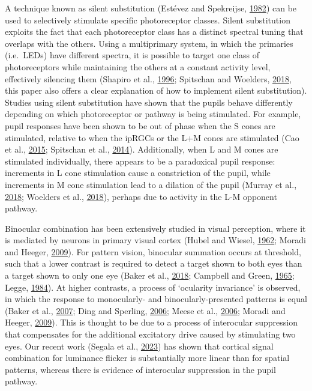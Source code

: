 \documentclass[
]{article}
\begin{document}
A technique known as silent substitution (Estévez and Spekreijse, \protect\hyperlink{ref-Estevez1982}{1982}) can be used to selectively stimulate specific photoreceptor classes. Silent substitution exploits the fact that each photoreceptor class has a distinct spectral tuning that overlaps with the others. Using a multiprimary system, in which the primaries (i.e.~LEDs) have different spectra, it is possible to target one class of photoreceptors while maintaining the others at a constant activity level, effectively silencing them (Shapiro et al., \protect\hyperlink{ref-Shapiro1996}{1996}; Spitschan and Woelders, \protect\hyperlink{ref-Spitschan2018}{2018}, this paper also offers a clear explanation of how to implement silent substitution). Studies using silent substitution have shown that the pupils behave differently depending on which photoreceptor or pathway is being stimulated. For example, pupil responses have been shown to be out of phase when the S cones are stimulated, relative to when the ipRGCs or the L+M cones are stimulated (Cao et al., \protect\hyperlink{ref-Cao2015}{2015}; Spitschan et al., \protect\hyperlink{ref-Spitschan2014}{2014}). Additionally, when L and M cones are stimulated individually, there appears to be a paradoxical pupil response: increments in L cone stimulation cause a constriction of the pupil, while increments in M cone stimulation lead to a dilation of the pupil (Murray et al., \protect\hyperlink{ref-Murray2018}{2018}; Woelders et al., \protect\hyperlink{ref-Woelders2018}{2018}), perhaps due to activity in the L-M opponent pathway.

Binocular combination has been extensively studied in visual perception, where it is mediated by neurons in primary visual cortex (Hubel and Wiesel, \protect\hyperlink{ref-Hubel1962}{1962}; Moradi and Heeger, \protect\hyperlink{ref-Moradi2009}{2009}). For pattern vision, binocular summation occurs at threshold, such that a lower contrast is required to detect a target shown to both eyes than a target shown to only one eye (Baker et al., \protect\hyperlink{ref-Baker2018}{2018}; Campbell and Green, \protect\hyperlink{ref-Campbell1965}{1965}; Legge, \protect\hyperlink{ref-Legge1984}{1984}). At higher contrasts, a process of `ocularity invariance' is observed, in which the response to monocularly- and binocularly-presented patterns is equal (Baker et al., \protect\hyperlink{ref-Baker2007}{2007}; Ding and Sperling, \protect\hyperlink{ref-Ding2006}{2006}; Meese et al., \protect\hyperlink{ref-Meese2006}{2006}; Moradi and Heeger, \protect\hyperlink{ref-Moradi2009}{2009}). This is thought to be due to a process of interocular suppression that compensates for the additional excitatory drive caused by stimulating two eyes. Our recent work (Segala et al., \protect\hyperlink{ref-Segala2023}{2023}) has shown that cortical signal combination for luminance flicker is substantially more linear than for spatial patterns, whereas there is evidence of interocular suppression in the pupil pathway.
\end{document}
